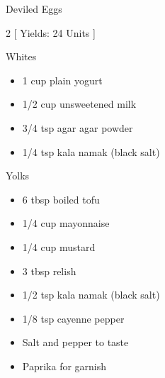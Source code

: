 \begin{Large}
    Deviled Eggs
\end{Large}

\begin{scriptsize}
\begin{multicols}{2}
[
\vspace{1em}
Yields: 24 Units
\vspace{-1.5em}
]

Whites
\begin{itemize}
    \item 1 cup plain yogurt
    \item 1/2 cup unsweetened milk
    \item 3/4 tsp agar agar powder
    \item 1/4 tsp kala namak (black salt)
\end{itemize}

Yolks
\begin{itemize}
    \item 6 tbsp boiled tofu
    \item 1/4 cup mayonnaise
    \item 1/4 cup mustard
    \item 3 tbsp relish
    \item 1/2 tsp kala namak (black salt)
    \item 1/8 tsp cayenne pepper
    \item Salt and pepper to taste
    \item Paprika for garnish
\end{itemize}
\end{multicols}
\end{scriptsize}


